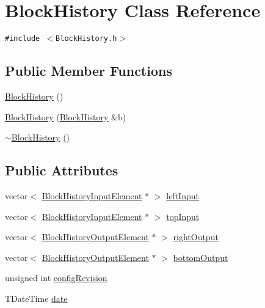 \hypertarget{classBlockHistory}{
\section{BlockHistory Class Reference}
\label{classBlockHistory}
}
{\tt \#include $<$BlockHistory.h$>$}

\subsection*{Public Member Functions}
\begin{CompactItemize}
\item 
\hyperlink{classBlockHistory_c489ea0976659cf022e67ef750162313}{BlockHistory} ()
\item 
\hyperlink{classBlockHistory_26fc96f5239718c5866d2682161c1800}{BlockHistory} (\hyperlink{classBlockHistory}{BlockHistory} \&b)
\item 
\hyperlink{classBlockHistory_0647b0c5491b4755250ee1e0d5cb9a8f}{$\sim$BlockHistory} ()
\end{CompactItemize}
\subsection*{Public Attributes}
\begin{CompactItemize}
\item 
vector$<$ \hyperlink{classBlockHistoryInputElement}{BlockHistoryInputElement} $\ast$ $>$ \hyperlink{classBlockHistory_aabd8ceb5c5cf94ca36778ad9a703c79}{leftInput}
\item 
vector$<$ \hyperlink{classBlockHistoryInputElement}{BlockHistoryInputElement} $\ast$ $>$ \hyperlink{classBlockHistory_206bee2db6d12c0d406d90d3dc4b54ac}{topInput}
\item 
vector$<$ \hyperlink{classBlockHistoryOutputElement}{BlockHistoryOutputElement} $\ast$ $>$ \hyperlink{classBlockHistory_e7d44768a04aeb3d73444ec684486f08}{rightOutput}
\item 
vector$<$ \hyperlink{classBlockHistoryOutputElement}{BlockHistoryOutputElement} $\ast$ $>$ \hyperlink{classBlockHistory_d6bac65bd73326840162bbb9cd8d14c1}{bottomOutput}
\item 
unsigned int \hyperlink{classBlockHistory_a491be49ba9d081df6d1213481346ea9}{configRevision}
\item 
TDateTime \hyperlink{classBlockHistory_0b1d6f43a3ba643ad8f387f7c9f2abc7}{date}
\end{CompactItemize}


